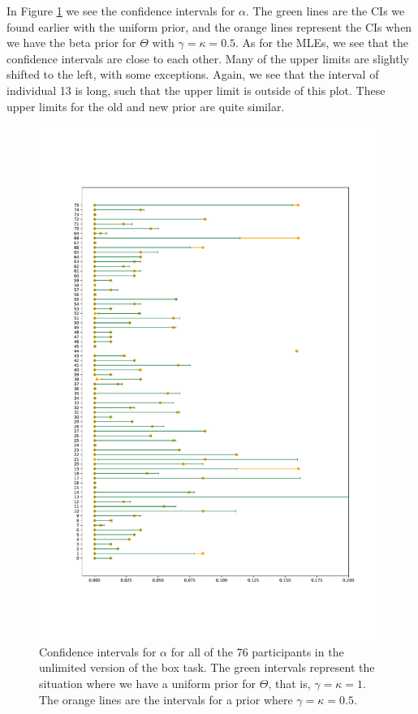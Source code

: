 In Figure \ref{fig:sensitivity_unlim_cis_alpha} we see the confidence intervals for $\alpha$. The green lines are the CIs we found earlier with the uniform prior, and the orange lines represent the CIs when we have the beta prior for $\Theta$ with $\gamma=\kappa=0.5$. As for the MLEs, we see that the confidence intervals are close to each other. Many of the upper limits are slightly shifted to the left, with some exceptions. Again, we see that the interval of individual 13 is long, such that the upper limit is outside of this plot. These upper limits for the old and new prior are quite similar. 
\begin{figure}
    \centering
    \includegraphics[scale=0.37]{pictures/Sensitivity/ci_unlim_alpha_pdf.pdf}
    \caption[CIs for $\alpha$ for all participants with two different priors, unlimited]{
    Confidence intervals for $\alpha$ for all of the 76 participants in the unlimited version of the box task. The green intervals represent the situation where we have a uniform prior for $\Theta$, that is, $\gamma=\kappa=1$. The orange lines are the intervals for a prior where $\gamma=\kappa=0.5$.}
    \label{fig:sensitivity_unlim_cis_alpha}
\end{figure}


